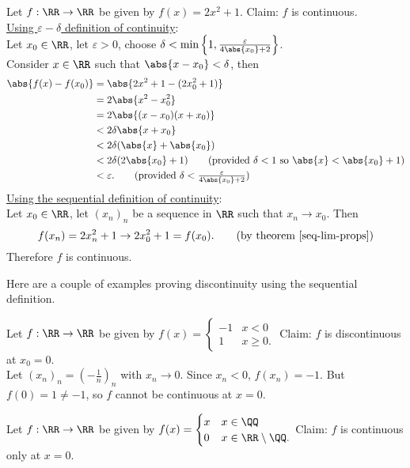\documentclass[../real_analysis.tex]{subfiles}
\begin{document}
        \begin{example}
            Let $f: \RR\to\RR$ be given by $f(x)=2x^2+1$. Claim: $f$ is continuous.\\
            \underline{Using $\varepsilon-\delta$ definition of continuity}:\\
            Let $x_0\in\RR$, let $\varepsilon>0$, choose $\delta<\min\left\{1, \frac{\varepsilon}{4\abs{x_0}+2}\right\}$.\\
            Consider $x\in\RR$ such that $\abs{x-x_0}<\delta$, then
            \begin{align}
                \abs{f(x)-f(x_0)}&=\abs{2x^2+1-(2x_0^2+1)}\\
                &=2\abs{x^2-x_0^2}\\
                &=2\abs{(x-x_0)(x+x_0)}\\
                &<2\delta\abs{x+x_0}\\
                &<2\delta(\abs{x}+\abs{x_0})\\
                &<2\delta(2\abs{x_0}+1)\tag{provided $\delta<1$ so $\abs{x}<\abs{x_0}+1$}\\
                &<\varepsilon.\tag{provided $\delta<\frac{\varepsilon}{4\abs{x_0}+2}$}
            \end{align}
            \underline{Using the sequential definition of continuity}:\\
            Let $x_0\in\RR$, let $(x_n)_n$ be a sequence in $\RR$ such that $x_n\to x_0$. Then
            \begin{equation}
                f(x_n)=2x_n^2+1\to2x_0^2+1=f(x_0).\tag{by theorem \ref{seq-lim-props}}
            \end{equation}
            Therefore $f$ is continuous.
        \end{example}
        Here are a couple of examples proving discontinuity using the sequential definition.
        \begin{example}
            Let $f: \RR\to\RR$ be given by $f(x)=\begin{cases}
                -1 & x<0\\
                1 & x\geq0.
            \end{cases}$ Claim: $f$ is discontinuous at $x_0=0$.\\
            Let $(x_n)_n=\left(-\frac{1}{n}\right)_n$ with $x_n\to0$. Since $x_n<0$, $f(x_n)=-1$. But $f(0)=1\neq-1$, so $f$ cannot be continuous at $x=0$.
        \end{example}
        \begin{example}
            Let $f: \RR\to\RR$ be given by $f(x)=\begin{cases}
                x & x\in\QQ\\
                0 & x\in\RR\setminus\QQ.
            \end{cases}$ Claim: $f$ is continuous only at $x=0$.
        \end{example}
\end{document}
